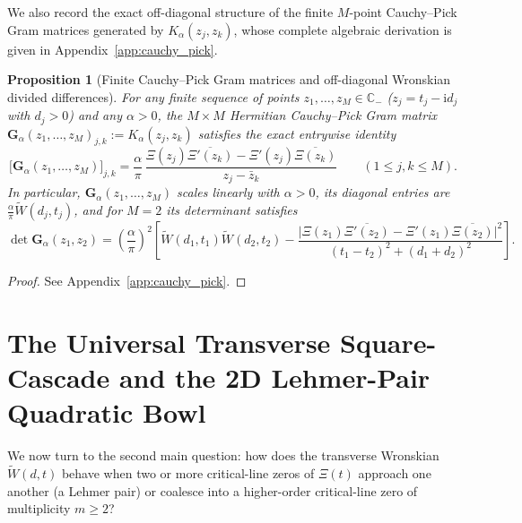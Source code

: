 \documentclass[11pt,reqno,a4paper]{amsart}
\theoremstyle{plain}
\newtheorem{proposition}[theorem]{Proposition}
\theoremstyle{definition}
\theoremstyle{remark}
\numberwithin{equation}{section}
\newcommand{\ii}{\mathrm{i}}
\begin{document}
We also record the exact off-diagonal structure of the finite $M$-point Cauchy--Pick Gram matrices generated by $K_\alpha(z_j, z_k)$, whose complete algebraic derivation is given in Appendix~\ref{app:cauchy_pick}.

\begin{proposition}[Finite Cauchy--Pick Gram matrices and off-diagonal Wronskian divided differences]\label{prop:cauchy_pick_gram}
For any finite sequence of points $z_1,\dots,z_M \in \mathbb{C}_-$ ($z_j = t_j - \ii d_j$ with $d_j > 0$) and any $\alpha > 0$, the $M \times M$ Hermitian Cauchy--Pick Gram matrix $\mathbf{G}_\alpha(z_1,\dots,z_M)_{j,k} := K_\alpha(z_j, z_k)$ satisfies the exact entrywise identity
\begin{equation}\label{eq:gram_divided_diff}
  \big[\mathbf{G}_\alpha(z_1,\dots,z_M)\big]_{j,k}
  = \frac{\alpha}{\pi}\,\frac{\Xi(z_j)\overline{\Xi'(z_k)} - \Xi'(z_j)\overline{\Xi(z_k)}}{z_j - \bar{z}_k}
  \qquad (1 \le j,k \le M).
\end{equation}
In particular, $\mathbf{G}_\alpha(z_1,\dots,z_M)$ scales linearly with $\alpha > 0$, its diagonal entries are $\frac{\alpha}{\pi}\widetilde{W}(d_j, t_j)$, and for $M = 2$ its determinant satisfies
\begin{equation}\label{eq:two_point_det}
  \det\mathbf{G}_\alpha(z_1, z_2)
  = \left(\frac{\alpha}{\pi}\right)^2\left[
    \widetilde{W}(d_1,t_1)\widetilde{W}(d_2,t_2)
    - \frac{\big|\Xi(z_1)\overline{\Xi'(z_2)} - \Xi'(z_1)\overline{\Xi(z_2)}\big|^2}{(t_1 - t_2)^2 + (d_1 + d_2)^2}
  \right].
\end{equation}
\end{proposition}

\begin{proof}
See Appendix~\ref{app:cauchy_pick}.
\end{proof}

\section{The Universal Transverse Square-Cascade and the 2D Lehmer-Pair Quadratic Bowl}\label{sec:lehmer_cascade}

We now turn to the second main question: how does the transverse Wronskian $\widetilde{W}(d,t)$ behave when two or more critical-line zeros of $\Xi(t)$ approach one another (a Lehmer pair) or coalesce into a higher-order critical-line zero of multiplicity $m \ge 2$?
\end{document}

